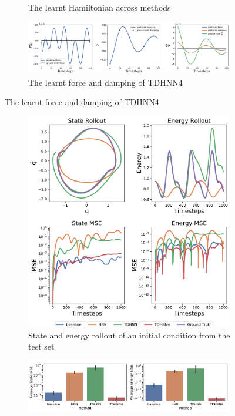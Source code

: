 \documentclass[twoside]{article}
\begin{document}
\begin{figure}[!htb]
\begin{subfigure}[b]{0.48\textwidth}
\caption{The learnt Hamiltonian across methods}
\end{subfigure}
\begin{subfigure}[b]{0.48\textwidth}
\includegraphics[width=\textwidth]{figures/figures/damped/1/damped_dpdt_0.pdf}
\caption{The learnt force and damping of TDHNN4}
\end{subfigure}
\label{mspring_full}
\end{figure}
\begin{figure}[!htb]
\centering
\captionsetup{justification=centering}
\begin{subfigure}[b]{0.48\textwidth}
\includegraphics[width=\textwidth]{figures/figures/forced_mass_spring/1/forced_mass_spring_long_0.pdf}
\caption{State and energy rollout of an initial condition from the test set}
\end{subfigure}
\begin{subfigure}[b]{0.48\textwidth}
\includegraphics[width=\textwidth]{figures/figures/forced_mass_spring/1/forced_mass_spring_errors_0.pdf}

\end{subfigure}
\end{figure}
\end{document}
